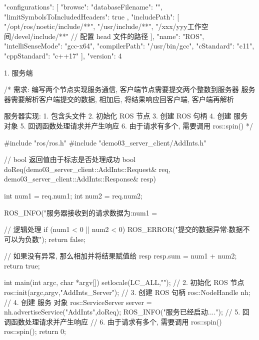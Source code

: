 \documentclass[openany, fontset=windowsold]{ctexbook}
\theoremstyle{kaiti}
\theoremstyle{normal}
\begin{document}
\begin{xml}
  {
      "configurations": [
          {
              "browse": {
                  "databaseFilename": "",
                  "limitSymbolsToIncludedHeaders": true
              },
              "includePath": [
                  "/opt/ros/noetic/include/**",
                  "/usr/include/**",
                  "/xxx/yyy工作空间/devel/include/**" // 配置 head 文件的路径 
              ],
              "name": "ROS",
              "intelliSenseMode": "gcc-x64",
              "compilerPath": "/usr/bin/gcc",
              "cStandard": "c11",
              "cppStandard": "c++17"
          }
      ],
      "version": 4
  }
\end{xml}

1. 服务端

\begin{cpp}
  /*
      需求: 
          编写两个节点实现服务通信, 客户端节点需要提交两个整数到服务器
          服务器需要解析客户端提交的数据, 相加后, 将结果响应回客户端, 
          客户端再解析

      服务器实现:
          1. 包含头文件
          2. 初始化 ROS 节点
          3. 创建 ROS 句柄
          4. 创建 服务 对象
          5. 回调函数处理请求并产生响应
          6. 由于请求有多个, 需要调用 ros::spin()
  */

  #include "ros/ros.h"
  #include "demo03_server_client/AddInts.h"

  // bool 返回值由于标志是否处理成功
  bool doReq(demo03_server_client::AddInts::Request& req,
            demo03_server_client::AddInts::Response& resp){
      int num1 = req.num1;
      int num2 = req.num2;

      ROS_INFO("服务器接收到的请求数据为:num1 = %

      // 逻辑处理
      if (num1 < 0 || num2 < 0)
      {
          ROS_ERROR("提交的数据异常:数据不可以为负数");
          return false;
      }

      // 如果没有异常, 那么相加并将结果赋值给 resp
      resp.sum = num1 + num2;
      return true;
  }

  int main(int argc, char *argv[])
  {
      setlocale(LC_ALL,"");
      // 2. 初始化 ROS 节点
      ros::init(argc,argv,"AddInts_Server");
      // 3. 创建 ROS 句柄
      ros::NodeHandle nh;
      // 4. 创建 服务 对象
      ros::ServiceServer server = nh.advertiseService("AddInts",doReq);
      ROS_INFO("服务已经启动....");
      //     5. 回调函数处理请求并产生响应
      //     6. 由于请求有多个, 需要调用 ros::spin()
      ros::spin();
      return 0;
  }
\end{cpp}
\end{document}
